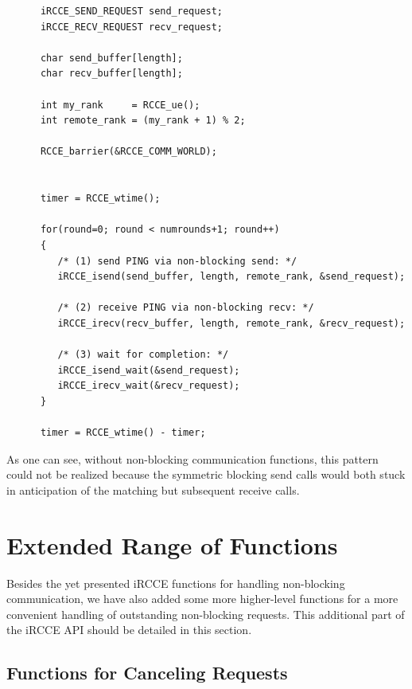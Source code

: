 \documentclass[fontsize=10pt, paper=a4, DIV12, pagesize=auto]{scrartcl}
\begin{document}
\begin{verbatim}
      iRCCE_SEND_REQUEST send_request;
      iRCCE_RECV_REQUEST recv_request;
      
      char send_buffer[length];
      char recv_buffer[length];
      
      int my_rank     = RCCE_ue();
      int remote_rank = (my_rank + 1) % 2;
      
      RCCE_barrier(&RCCE_COMM_WORLD);
      
        
      timer = RCCE_wtime();
           
      for(round=0; round < numrounds+1; round++)
      {      
         /* (1) send PING via non-blocking send: */
         iRCCE_isend(send_buffer, length, remote_rank, &send_request);

         /* (2) receive PING via non-blocking recv: */
         iRCCE_irecv(recv_buffer, length, remote_rank, &recv_request);
      
         /* (3) wait for completion: */
         iRCCE_isend_wait(&send_request);
         iRCCE_irecv_wait(&recv_request);
      }
       
      timer = RCCE_wtime() - timer;      
\end{verbatim}

\noindent As one can see, without non-blocking communication functions, this pattern could not be realized because the symmetric blocking send calls would both stuck in anticipation of the matching but subsequent receive calls.

\newpage

\section{Extended Range of Functions}\label{sec:extended}

Besides the yet presented iRCCE functions for handling non-blocking communication, we have also added some more higher-level functions for a more convenient handling of outstanding non-blocking requests. This additional part of the iRCCE API should be detailed in this section.


\subsection{Functions for Canceling Requests}\label{sec:extended:cancel}
\end{document}
